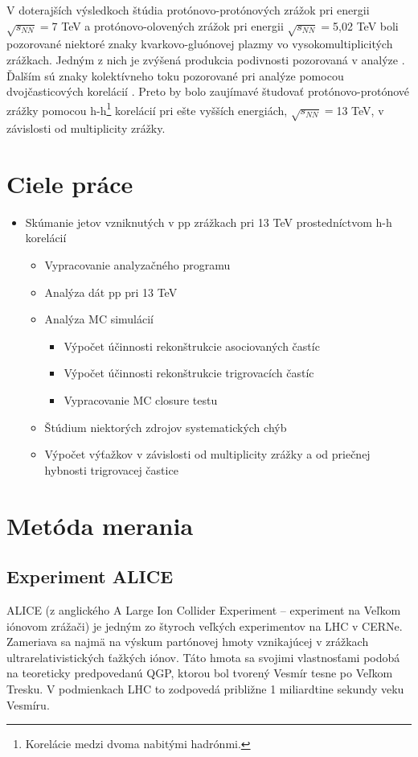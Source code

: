 \documentclass[thesismargins, thesislinespacing]{rnthesis}
\begin{document}
V doterajších výsledkoch štúdia protónovo-protónových zrážok pri energii $\sqrt{s_{NN}}=$7 TeV a protónovo-olovených zrážok pri energii $\sqrt{s_{NN}}=$5,02 TeV boli pozorované niektoré znaky kvarkovo-gluónovej plazmy vo vysokomultiplicitých zrážkach. Jedným z nich je zvýšená produkcia podivnosti pozorovaná v analýze \cite{nature}. Ďalším sú znaky kolektívneho toku pozorované pri analýze pomocou dvojčasticových korelácií \cite{AlicepPb}. Preto by bolo zaujímavé študovať protónovo-protónové zrážky pomocou h-h\footnote{Korelácie medzi dvoma nabitými hadrónmi.}  korelácií pri ešte vyšších energiách, $\sqrt{s_{NN}}=$13 TeV, v závislosti od multiplicity zrážky.

\chapter{Ciele práce} 
\begin{itemize}
	\item Skúmanie jetov vzniknutých v pp zrážkach pri 13 TeV prostedníctvom h-h korelácií
	\begin{itemize}
		\item Vypracovanie analyzačného programu
		\item Analýza dát pp pri 13 TeV
		\item Analýza MC simulácií
		\begin{itemize}
			\item Výpočet účinnosti rekonštrukcie asociovaných častíc
			\item Výpočet účinnosti rekonštrukcie trigrovacích častíc
			\item Vypracovanie MC closure testu
		\end{itemize}
		\item Štúdium niektorých zdrojov systematických chýb
		\item Výpočet výťažkov v závislosti od multiplicity zrážky a od priečnej hybnosti trigrovacej častice
	\end{itemize}
\end{itemize}


\chapter{Metóda merania}

\section{Experiment ALICE}

ALICE (z anglického A Large Ion Collider Experiment – experiment na Veľkom iónovom zrážači) je jedným zo štyroch veľkých experimentov na LHC v CERNe. Zameriava sa najmä na výskum partónovej hmoty vznikajúcej v zrážkach ultrarelativistických ťažkých iónov. Táto hmota sa svojimi vlastnosťami podobá na teoreticky predpovedanú QGP, ktorou bol tvorený Vesmír tesne po Veľkom Tresku. V podmienkach LHC to zodpovedá približne 1 miliardtine sekundy veku Vesmíru.
\end{document}
